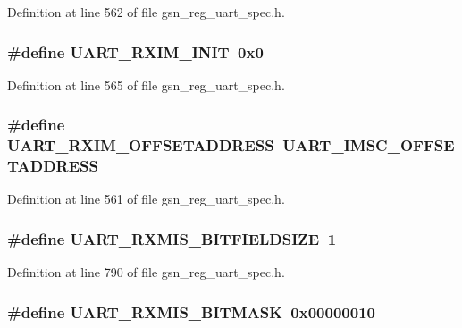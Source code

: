 Definition at line 562 of file gsn\_\-reg\_\-uart\_\-spec.h.

\hypertarget{a00575_aebce90e6979681d35d63fd23e9365a47}{
\subsubsection[{UART\_\-RXIM\_\-INIT}]{\setlength{\rightskip}{0pt plus 5cm}\#define UART\_\-RXIM\_\-INIT~0x0}}
\label{a00575_aebce90e6979681d35d63fd23e9365a47}


Definition at line 565 of file gsn\_\-reg\_\-uart\_\-spec.h.

\hypertarget{a00575_adea6a35f8f1d9bd17d594651a9500feb}{
\subsubsection[{UART\_\-RXIM\_\-OFFSETADDRESS}]{\setlength{\rightskip}{0pt plus 5cm}\#define UART\_\-RXIM\_\-OFFSETADDRESS~UART\_\-IMSC\_\-OFFSETADDRESS}}
\label{a00575_adea6a35f8f1d9bd17d594651a9500feb}


Definition at line 561 of file gsn\_\-reg\_\-uart\_\-spec.h.

\hypertarget{a00575_a6fe3e95c0b084a1b0b993ac3ca542684}{
\subsubsection[{UART\_\-RXMIS\_\-BITFIELDSIZE}]{\setlength{\rightskip}{0pt plus 5cm}\#define UART\_\-RXMIS\_\-BITFIELDSIZE~1}}
\label{a00575_a6fe3e95c0b084a1b0b993ac3ca542684}


Definition at line 790 of file gsn\_\-reg\_\-uart\_\-spec.h.

\hypertarget{a00575_a658775b1739164966559a3ccdf1d60c9}{
\subsubsection[{UART\_\-RXMIS\_\-BITMASK}]{\setlength{\rightskip}{0pt plus 5cm}\#define UART\_\-RXMIS\_\-BITMASK~0x00000010}}
\label{a00575_a658775b1739164966559a3ccdf1d60c9}


